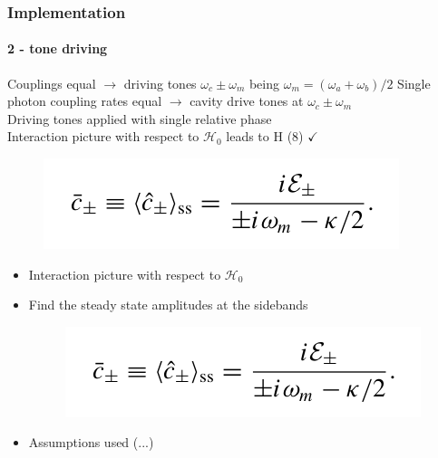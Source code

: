 \documentclass[aspectratio=43]{beamer}
\begin{document}
\begin{frame}
	
	\frametitle{Implementation}
	\framesubtitle{2 - tone driving}
	
	Couplings equal $\longrightarrow$ driving tones $\omega_{c} \pm \omega_{m}$ being  $\omega_{m} = (\omega_{a} + \omega_{b}) / 2$
	Single photon coupling rates equal $\longrightarrow$ cavity drive tones at $\omega_{c} \pm \omega_{m}$\\
	Driving tones applied with single relative phase\\
	Interaction picture with respect to $\mathcal{H}_{0}$ leads to H (8) $\checkmark$
	
	\begin{figure}
		\includegraphics[width = 5 cm]{plots/ss_2_tone.png}
	\end{figure}
	
	\begin{itemize}
		\item Interaction picture with respect to $\mathcal{H}_{0}$
		\item Find the steady state amplitudes at the sidebands
		\begin{figure}
			\includegraphics[width = 5 cm]{plots/ss_2_tone.png}
		\end{figure}
		\item Assumptions used (...)
	\end{itemize}

\end{frame}
\end{document}
